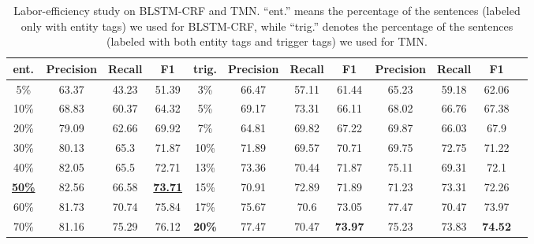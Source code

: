 \begin{table}[h]
{\begin{singlespace}
\begin{tabular}{@{}>{\columncolor{LightCyan}}c|ccc|>{\columncolor{LightCyan}}c|ccc|cccc@{}}
			\midrule
			\rowcolor{white}\textbf{ent.}  &
			\multicolumn{1}{c}{Precision}  &    
			\multicolumn{1}{c}{Recall}  &
			\multicolumn{1}{c|}{F1}  &  
			\textbf{trig.}  &
			\multicolumn{1}{c}{Precision}  &    
			\multicolumn{1}{c}{Recall}  &
			\multicolumn{1}{c|}{F1} &
			\multicolumn{1}{c}{Precision}  &    
			\multicolumn{1}{c}{Recall}  &
			\multicolumn{1}{c}{F1}  & 
			\\ 
			\midrule 
			5\%  &  63.37 & 43.23 & 51.39 & 3\%  & 66.47 & 57.11 & 61.44 & 65.23 & 59.18 & 62.06 \\
			10\% &  68.83 & 60.37 & 64.32 & 5\%  & 69.17 & 73.31 & 66.11 & 68.02 & 66.76 & 67.38   \\
            20\% &  79.09 & 62.66 & 69.92 & 7\%  & 64.81 & 69.82 & 67.22 & 69.87 & 66.03 & 67.9   \\
            30\% &  80.13 & 65.3 & 71.87 & 10\% & 71.89 & 69.57 & 70.71 & 69.75 & 72.75 & 71.22   \\
            40\% &  82.05 & 65.5 & 72.71 & 13\% & 73.36 & 70.44 & 71.87 & 75.11 & 69.31 & 72.1   \\
            \textbf{\underline{50\%} }&  82.56 & 66.58 & \textbf{\underline{73.71}} & 15\% & 70.91 & 72.89 & 71.89 & 71.23 & 73.31 & 72.26  \\
            60\% &  81.73 & 70.74 & 75.84 & 17\% & 75.67 & 70.6 & 73.05 & 77.47 & 70.47 & 73.97   \\
            70\% &  81.16 & 75.29 & 76.12 & \textbf{20\% }& 77.47 & 70.47 & \textbf{73.97} & 75.23 & 73.83 & \textbf{74.52}   \\
			\midrule
			\bottomrule
		\end{tabular}
		\end{singlespace}
	}
	\caption{Labor-efficiency study on BLSTM-CRF and TMN. ``ent.'' means the percentage of the sentences (labeled only with entity tags) we used for BLSTM-CRF, while ``trig.'' denotes the percentage of the sentences (labeled with both entity tags and trigger tags) we used for TMN. }
	\label{tab:results}
\end{table}

